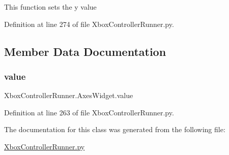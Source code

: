 \begin{DoxyVerb}This function sets the y value\end{DoxyVerb}
 

Definition at line 274 of file Xbox\+Controller\+Runner.\+py.



\subsection{Member Data Documentation}
\mbox{\label{class_xbox_controller_runner_1_1_axes_widget_a9bfe6a694135e62de289e4d58caa2f3c}} 
\subsubsection{\texorpdfstring{value}{value}}
{\footnotesize\ttfamily Xbox\+Controller\+Runner.\+Axes\+Widget.\+value}



Definition at line 263 of file Xbox\+Controller\+Runner.\+py.



The documentation for this class was generated from the following file\+:\begin{DoxyCompactItemize}
\item 
\mbox{\hyperlink{_xbox_controller_runner_8py}{Xbox\+Controller\+Runner.\+py}}\end{DoxyCompactItemize}
